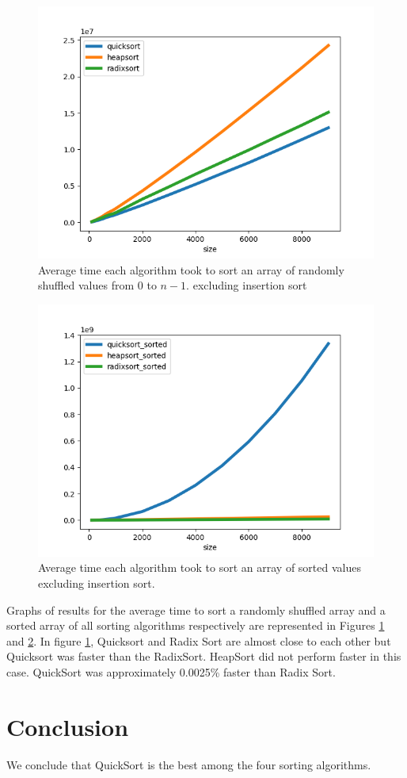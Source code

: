 \documentclass{article}
\begin{document}
\begin{figure}[ht]
\centering
\includegraphics[width=0.8\linewidth,height=0.4\textheight]{plt3.png}
\caption{Average time each algorithm took to sort an array of randomly shuffled values from $0$ to $n - 1$. excluding insertion sort}
\label{avg1}
\end{figure}
\begin{figure}[ht]
\centering
\includegraphics[width=0.8\linewidth,height=0.4\textheight]{plt4.png}
\caption{Average time each algorithm took to sort an array of sorted values excluding insertion sort.}
\label{avg1:best}
\end{figure}

Graphs of results for the average time to sort a randomly shuffled array and a sorted array of all sorting algorithms respectively are represented in Figures \ref{avg1} and \ref{avg1:best}.
In figure \ref{avg1}, Quicksort and Radix Sort are almost close to each other but Quicksort was faster than the RadixSort. HeapSort did not perform faster in this case.
QuickSort was approximately 0.0025\% faster than Radix Sort.
\section{Conclusion}
We conclude that QuickSort is the best among the four sorting algorithms.
\end{document}
